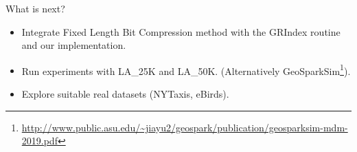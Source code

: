 \documentclass{beamer}
\begin{document}
\begin{frame}{What is next?}
    \begin{itemize}
        \item Integrate Fixed Length Bit Compression method with the GRIndex routine and our implementation.
        \item Run experiments with LA\_25K and LA\_50K. (Alternatively GeoSparkSim\footnote{\url{http://www.public.asu.edu/~jiayu2/geospark/publication/geosparksim-mdm-2019.pdf}}).  
        \item Explore suitable real datasets (NYTaxis, eBirds).
    \end{itemize}
\end{frame}
\end{document}
